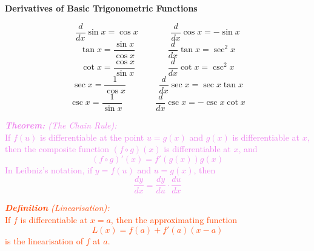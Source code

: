 \documentclass{report}
\newenvironment{definition}[1][OrangeRed]
  {\begin{tcolorbox}[colframe=#1,colback=white]}
  {\end{tcolorbox}}
\newenvironment{theorem}[1][Violet]
  {\begin{tcolorbox}[colframe=#1,colback=white]}
  {\end{tcolorbox}}
\newenvironment{information}[1][Cerulean]
  {\begin{tcolorbox}[colframe=#1,colback=white]}
  {\end{tcolorbox}}
\begin{document}
\begin{information}
\textcolor{Cerulean}{
    \begin{center}
        \textbf{Derivatives of Basic Trigonometric Functions}\\
    \end{center}}
    \textcolor{Cerulean}{
    \begin{equation}
        \frac{d}{dx} \sin{x} = \cos{x} \; \; \; \; \; \; \; \; \; \; \;\ \; \; \frac{d}{dx} \cos{x} = -\sin{x}
    \end{equation}
    \begin{equation}
        \tan{x} = \frac{\sin{x}}{\cos{x}} \; \; \; \; \; \; \; \; \; \; \;\ \; \; \frac{d}{dx}\tan{x} = \sec^2{x}
    \end{equation}
    \begin{equation}
        \cot{x} = \frac{\cos{x}}{\sin{x}} \; \; \; \; \; \; \; \; \; \; \;\ \; \; \frac{d}{dx}\cot{x} = \csc^2{x}
    \end{equation}
    \begin{equation}
        \sec{x} = \frac{1}{\cos{x}} \; \; \; \; \; \; \; \; \; \; \;\ \; \; \frac{d}{dx}\sec{x} = \sec{x}\tan{x}
    \end{equation}
    \begin{equation}
        \csc{x} = \frac{1}{\sin{x}} \; \; \; \; \; \; \; \; \; \; \;\ \; \; \frac{d}{dx}\csc{x} = -\csc{x}\cot{x}
    \end{equation}}
\end{information}
    
\begin{theorem}
    \textcolor{Violet}{\textit{\textbf{Theorem:} (The Chain Rule):}\\
    If $f(u)$ is differentiable at the point $u = g(x)$ and $g(x)$ is differentiable at $x$, then the composite function $(f \circ g)(x)$ is differentiable at $x$, and
    \begin{equation}
        (f \circ g)' (x) = f'(g(x)) g(x)
    \end{equation}
    In Leibniz's notation, if $y=f(u)$ and $u = g(x)$, then
    \begin{equation}
        \frac{dy}{dx} = \frac{dy}{du} \cdot \frac{du}{dx}
    \end{equation}}
\end{theorem}

\begin{definition}
    \textcolor{OrangeRed}{\textit{\textbf{Definition} (Linearisation):}\\
    If $f$ is differentiable at $x = a$, then the approximating function
    \begin{equation}
        L(x) = f(a) + f'(a)(x-a)
    \end{equation}
    is the linearisation of $f$ at $a$.}
\end{definition}
    
\end{document}
